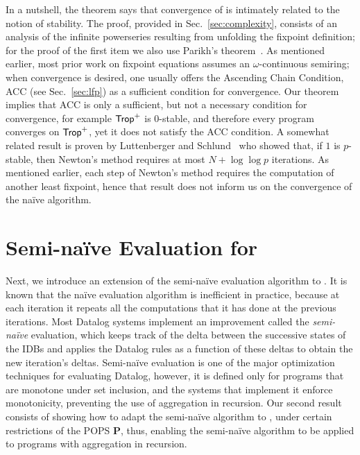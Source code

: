In a nutshell, the theorem says that convergence of \datalogo is
intimately related to the notion of stability.  The proof, provided in
Sec.~\ref{sec:complexity}, consists of an analysis of the infinite
powerseries resulting from unfolding the fixpoint definition; for
the proof of the first item we also use Parikh's
theorem~\cite{MR209093}.  As mentioned earlier, most prior work on
fixpoint equations assumes an $\omega$-continuous semiring; when
convergence is desired, one usually offers the Ascending Chain
Condition, ACC (see Sec.~\ref{sec:lfp}) as a sufficient condition for
convergence.  Our theorem implies that ACC is only a sufficient, but
not a necessary condition for convergence, for example $\text{\sf Trop}^+$ is
$0$-stable, and therefore every \datalogo program converges on
$\text{\sf Trop}^+$, yet it does not satisfy the ACC condition.  A somewhat
related result is proven by Luttenberger and
Schlund~\cite{DBLP:journals/iandc/LuttenbergerS16} who showed that, if
$1$ is $p$-stable, then Newton's method requires at most
$N + \log\log p$ iterations.  As mentioned earlier, each step of
Newton's method requires the computation of another least fixpoint,
hence that result does not inform us on the convergence of the na\"ive
algorithm.

\section{Semi-na\"ive Evaluation for \datalogo}
\label{sec:semi-naive}

Next, we introduce an extension of the semi-na\"ive evaluation
algorithm to \datalogo.  It is known that the na\"ive evaluation
algorithm is inefficient in practice, because at each iteration it
repeats all the computations that it has done at the previous
iterations.  Most Datalog systems implement an improvement called the
{\em semi-na\"ive} evaluation, which keeps track of the delta between
the successive states of the IDBs and applies the Datalog rules as a
function of these deltas to obtain the new iteration's deltas.
Semi-na\"ive evaluation is one of the major optimization techniques
for evaluating Datalog, however, it is defined only for programs that
are monotone under set inclusion, and the systems that implement it
enforce monotonicity, preventing the use of aggregation in
recursion. Our second result consists of showing how to adapt the
semi-na\"ive algorithm to \datalogo, under certain restrictions of the
POPS $\bm P$, thus, enabling the semi-na\"ive algorithm to be applied
to programs with aggregation in recursion.
